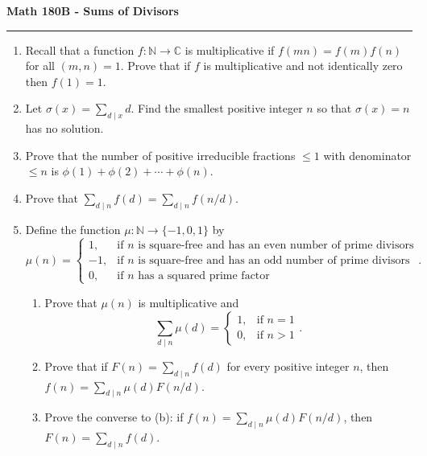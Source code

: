 \documentclass[11pt,letterpaper]{report}
\newcommand{\naturals}{\mathbb{N}}
\newcommand{\complex}{\mathbb{C}}
\begin{document}
\begin{center}
{\bf \Large Math 180B - Sums of Divisors}
\vspace{0.2cm}
\hrule
\end{center}

\begin{enumerate}
	\item Recall that a function $f:\naturals\to \complex$ is multiplicative if $f(mn) = f(m)f(n)$ for all $(m,n) = 1$. Prove that if $f$ is multiplicative and not identically zero then $f(1) = 1$.

	\vfill

	\item Let $\sigma(x) = \sum_{d\mid x}d$. Find the smallest positive integer $n$ so that $\sigma(x) = n$ has no solution.

	\vfill

	\item Prove that the number of positive irreducible fractions $\leq 1$ with denominator $\leq n$ is $\phi(1) +\phi(2) + \cdots + \phi(n)$.

	\vfill

	\item Prove that $\sum_{d\mid n}f(d) = \sum_{d\mid n}f(n/d)$.

	\vfill

	\item Define the function $\mu: \naturals \to \{-1, 0, 1\}$ by
	\[
	\mu(n) = \begin{cases}
		1,&\text{if }n\text{ is square-free and has an even number of prime divisors}\\
		-1,&\text{if }n\text{ is square-free and has an odd number of prime divisors}\\
		0,&\text{if }n\text{ has a squared prime factor}
	\end{cases}.
	\]
	\begin{enumerate}
		\item Prove that $\mu(n)$ is multiplicative and
		\[
		\sum_{d\mid n}\mu(d) = \begin{cases}
			1,&\text{if }n=1\\
			0,&\text{if }n>1
		\end{cases}.
		\]

		\vfill

		\item Prove that if $F(n) = \sum_{d\mid n}f(d)$ for every positive integer $n$, then $f(n) = \sum_{d\mid n}\mu(d)F(n/d)$.

		\vfill

		\item Prove the converse to (b): if $f(n) = \sum_{d\mid n}\mu(d)F(n/d)$, then $F(n) = \sum_{d\mid n}f(d)$.
	\end{enumerate}

	\vfill
\end{enumerate}
\end{document}
